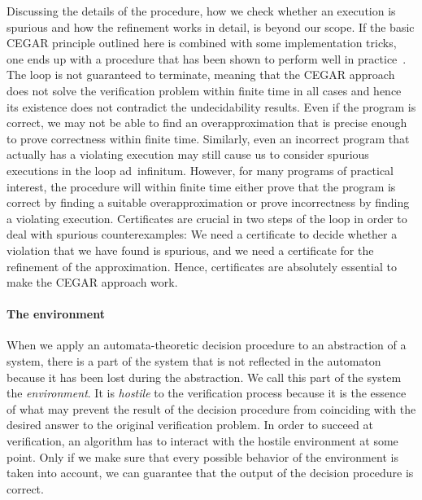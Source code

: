 \documentclass[../../diss.tex]{subfiles}
\begin{document}
Discussing the details of the procedure, \eg how we check whether an execution is spurious and how the refinement works in detail, is beyond our scope.
If the basic CEGAR principle outlined here is combined with some implementation tricks, one ends up with a procedure that has been shown to perform well in practice~\cite{HeizmannCDGNMSS17}.
The loop is not guaranteed to terminate, meaning that the CEGAR approach does not solve the verification problem within finite time in all cases and hence its existence does not contradict the undecidability results.
Even if the program is correct, we may not be able to find an overapproximation that is precise enough to prove correctness within finite time.
Similarly, even an incorrect program that actually has a violating execution may still cause us to consider spurious executions in the loop ad~infinitum.
However, for many programs of practical interest, the procedure will within finite time either prove that the program is correct by finding a suitable overapproximation or prove incorrectness by finding a violating execution.
Certificates are crucial in two steps of the loop in order to deal with spurious counterexamples:
We need a certificate to decide whether a violation that we have found is spurious, and we need a certificate for the refinement of the approximation.
Hence, certificates are absolutely essential to make the CEGAR approach work.

\paragraph{The environment}

When we apply an automata-theoretic decision procedure to an abstraction of a system, there is a part of the system that is not reflected in the automaton because it has been lost during the abstraction.
We call this part of the system the \emph{environment}.
It is \emph{hostile} to the verification process because it is the essence of what may prevent the result of the decision procedure from coinciding with the desired answer to the original verification problem.
In order to succeed at verification, an algorithm has to interact with the hostile environment at some point.
Only if we make sure that every possible behavior of the environment is taken into account, we can guarantee that the output of the decision procedure is correct.
\end{document}
